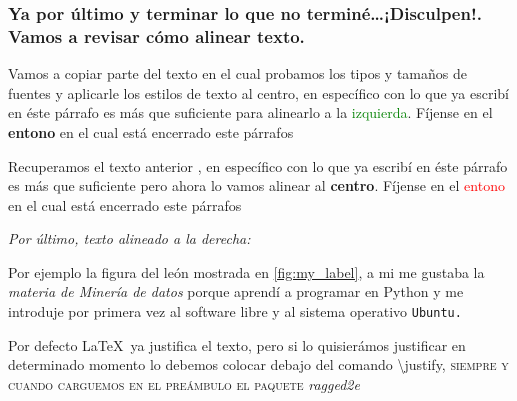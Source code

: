 \documentclass{article}
\begin{document}
\subsubsection{Ya por último y terminar lo que no terminé\ldots ¡Disculpen!. Vamos a revisar cómo alinear texto.}%
\begin{flushleft}
Vamos a copiar parte del texto en el cual probamos los tipos y tamaños de fuentes y aplicarle los estilos de texto al centro, en específico con lo que ya escribí en éste párrafo es más que suficiente para alinearlo a la \textcolor{green}{izquierda}.  Fíjense en el \textbf{entono} en el cual está encerrado este párrafos
\end{flushleft}
\begin{center}
    Recuperamos el texto anterior , en específico con lo que ya escribí en éste párrafo es más que suficiente pero ahora lo vamos alinear al \textbf{centro}. Fíjense en el \textcolor{red}{entono} en el cual está encerrado este párrafos
\end{center}
\textit{Por último, texto alineado a la derecha:}
\begin{flushright}
Por ejemplo la figura del león mostrada en \ref{fig:my_label}, a mi me gustaba la \textit{materia de Minería de datos} porque aprendí a programar en {\tiny Python} y me introduje por primera vez al software libre y al sistema operativo \texttt{Ubuntu.}
\end{flushright}
Por defecto \LaTeX\ ya justifica el texto, pero si lo quisierámos justificar en determinado momento lo debemos colocar debajo del comando \textbackslash{justify}, \textsc{siempre y cuando carguemos en el preámbulo el paquete} \emph{ragged2e}

\nocite{*}
\end{document}
